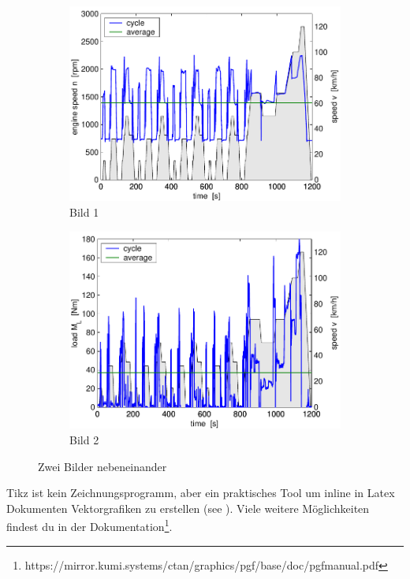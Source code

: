 \begin{figure}[hbp]
  \begin{subfigure}[t]{0.48\textwidth}
    \includegraphics[width = \textwidth]{images/cycle_we.pdf}
    \caption{Bild 1}
    \label{pics:cycle:1}
  \end{subfigure}
  \hfill
  \begin{subfigure}[t]{0.48\textwidth}
    \includegraphics[width = \textwidth]{images/cycle_ml.pdf}
    \caption{Bild 2}
    \label{pics:cycle:2}
  \end{subfigure}
  \caption{Zwei Bilder nebeneinander}
  \label{pics:cycle}
\end{figure}

Tikz ist kein Zeichnungsprogramm, aber ein praktisches Tool um inline in Latex Dokumenten Vektorgrafiken zu erstellen (see ). Viele weitere Möglichkeiten findest du in der Dokumentation\footnote{https://mirror.kumi.systems/ctan/graphics/pgf/base/doc/pgfmanual.pdf}.

